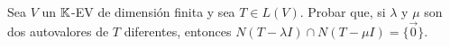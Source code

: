 \item Sea $V$ un $\mathbb{K}$-EV de dimensión finita y sea $T\in L(V)$. Probar que, si $\lambda$ y $\mu$ son dos autovalores de $T$ diferentes, entonces $N(T-\lambda I)\cap N(T-\mu I)=\{\vec{0}\}$.
    \begin{mdframed}[style=s]
        
    \end{mdframed}